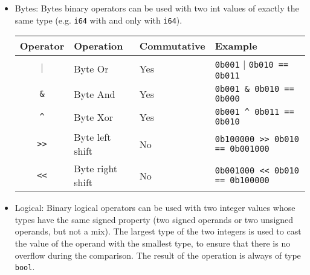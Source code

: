 \begin{itemize}
\item Bytes: Bytes binary operators can be used with two int values of exactly
  the same type (e.g. \texttt{i64} with and only with \texttt{i64}).

  \begin{center}
    \vspace{-20pt}
    \begin{adjustbox}{max width=1.0\linewidth}
      \begin{tabular}{|c|l l l|}
        \hline
        Operator & Operation & Commutative & Example \\[0pt]
        \hline
        \hline
        \texttt{\(\vert\)} & Byte Or & Yes & \texttt{0b001} \(\vert{}\) \texttt{0b010 == 0b011}\\[0pt]
        \texttt{\&} & Byte And & Yes & \texttt{0b001 \& 0b010 == 0b000}\\[0pt]
        \texttt{\textasciicircum{}} & Byte Xor & Yes & \texttt{0b001 \textasciicircum{} 0b011 == 0b010}\\[0pt]
        \texttt{>>} & Byte left shift & No & \texttt{0b100000 >> 0b010 == 0b001000}\\[0pt]
        \texttt{<<} & Byte right shift & No & \texttt{0b001000 << 0b010 == 0b100000}\\[0pt]
        \hline
      \end{tabular}
    \end{adjustbox}
  \end{center}

\item Logical: Binary logical operators can be used with two integer values
  whose types have the same signed property (two signed operands or two unsigned
  operands, but not a mix). The largest type of the two integers is used to cast
  the value of the operand with the smallest type, to ensure that there is no
  overflow during the comparison. The result of the operation is always of type
  \texttt{bool}.


\end{itemize}
